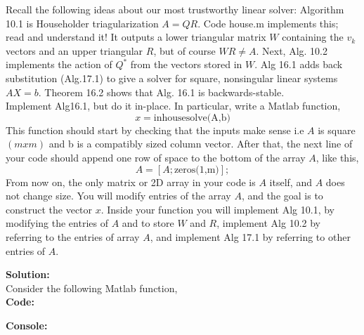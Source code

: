 \documentclass[12pt]{article}
\makeatletter
\theoremstyle{homework}
\newenvironment{exercise}[1]
{\def\@currentlabel{#1}\exercisecore}
{\endexercisecore}
\newcommand{\localhead}[1]{\par\smallskip\noindent\textbf{#1}\nobreak\\}%
\newcommand\solution{\localhead{Solution:}}
\makeatother
\begin{document}
\begin{exercise}{F5} Recall the following ideas about our most trustworthy linear solver: Algorithm 10.1 is Householder triagularization $A = QR$. Code house.m implements this; read 
  and understand it! It outputs a lower triangular matrix $W$ containing the $v_k$ vectors and an upper triangular $R$, but of course $WR \neq A$. Next, Alg. 10.2 implements the action of $Q^*$
  from the vectors stored in $W$. Alg 16.1 adds back substitution (Alg.17.1) to give a solver for square, nonsingular linear systems $AX = b$. Theorem 16.2 shows that Alg. 16.1 is backwards-stable. \\
  Implement Alg16.1, but do it in-place. In particular, write a Matlab function,
  \begin{equation*}
    x = \text{inhousesolve(A,b)}
  \end{equation*}
  This function should start by checking that the inputs make sense i.e $A$ is square $(mxm)$ and b is a compatibly sized column vector. After that, the next line of your code should append one row of space to the bottom of the array $A$, like this, 
  \begin{equation*}
    A = [A; \text{zeros(1,m)}];
  \end{equation*}
  From now on, the only matrix or 2D array in your code is $A$ itself, and $A$ does not change size. You will modify entries of the array $A$, and the goal is to construct the vector $x$. 
  Inside your function you will implement Alg 10.1,  by modifying the entries of $A$ and to store $W$ and $R$, implement Alg 10.2 by referring to the entries of array $A$, and implement Alg 17.1 by referring to other entries of $A$.\\
  \solution Consider the following Matlab function,\\
  \textbf{Code:}
  \begin{center}
  
  \end{center} 
  \textbf{Console:}
  \begin{center}
  
  \end{center} 
\end{exercise}
\newpage
\end{document}
